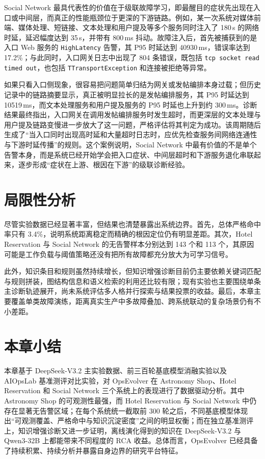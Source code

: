 Social Network 最具代表性的价值在于级联故障学习，即最醒目的症状先出现在入口或中间层，而真正的性能瓶颈位于更深的下游链路。例如，某一次系统对媒体前端、媒体处理、短链接、文本处理和用户提及等多个服务同时注入了 180\,s 的网络时延，延迟幅度达到 35\,s，并带有 800\,ms 抖动。故障注入后，首先被捕获到的是入口 Web 服务的 \texttt{HighLatency} 告警，其 P95 时延达到 40930\,ms，错误率达到 17.2\%；与此同时，入口网关日志中出现了 804 条错误，既包括 \texttt{tcp socket read timed out}，也包括 \texttt{TTransportException} 和连接被拒绝等异常。

如果只看入口侧现象，很容易把问题简单归结为网关或发帖编排本身过载；但历史记录中的链路摘要显示，真正被明显拉长的是发帖编排服务，其 P95 时延达到 10519\,ms，而文本处理服务和用户提及服务的 P95 时延也上升到约 300\,ms。诊断结果最终指出，入口网关在调用发帖编排服务时发生超时，而更深层的文本处理与用户提及链路变慢进一步放大了这一问题，严格评估将其判定为成功。该周期随后生成了“当入口同时出现高时延和大量超时日志时，应优先检查服务间网络连通性与下游时延传播”的规则。这个案例说明，Social Network 中最有价值的不是单个告警本身，而是系统已经开始学会把入口症状、中间层超时和下游服务退化串联起来，逐步形成“症状在上游、根因在下游”的级联诊断经验。

\section{局限性分析}
\label{sec:limitations}

尽管实验数据已经显著丰富，但结果也清楚暴露出系统边界。首先，总体严格命中率只有 3.4\%，说明系统距离稳定而精确的根因定位仍有明显差距。其次，Hotel Reservation 与 Social Network 的无告警样本分别达到 143 个和 113 个，其原因可能是工作负载与阈值策略还没有把所有故障都充分放大为可学习信号。

此外，知识条目和规则虽然持续增长，但知识增强诊断目前仍主要依赖关键词匹配与规则拼装，图结构信息和语义检索的利用还比较有限；现有实验也主要围绕单条主诊断轨迹展开，尚未系统评估多人格并行探索与结果投票的收益。最后，本章主要覆盖单类故障演练，距离真实生产中多故障叠加、跨系统联动的复杂场景仍有不小差距。

\section{本章小结}
\label{sec:chap04_summary}

本章基于 DeepSeek-V3.2 主实验数据、前三百轮基底模型消融实验以及 AIOpsLab 基准测评对比实验，对 OpsEvolver 在 Astronomy Shop、Hotel Reservation 和 Social Network 三个系统上的表现进行了数据驱动分析。其中 Astronomy Shop 的可观测性最强，而 Hotel Reservation 与 Social Network 中仍存在显著无告警区域；在每个系统统一截取前 300 轮之后，不同基底模型体现出“可观测覆盖、严格命中与知识沉淀密度”之间的明显权衡；而在独立基准测评上，知识增强诊断又进一步证明，离线演化得到的知识在 DeepSeek-V3.2 与 Qwen3-32B 上都能带来不同程度的 RCA 收益。总体而言，OpsEvolver 已经具备了持续积累、持续分析并暴露自身边界的研究平台特征。
